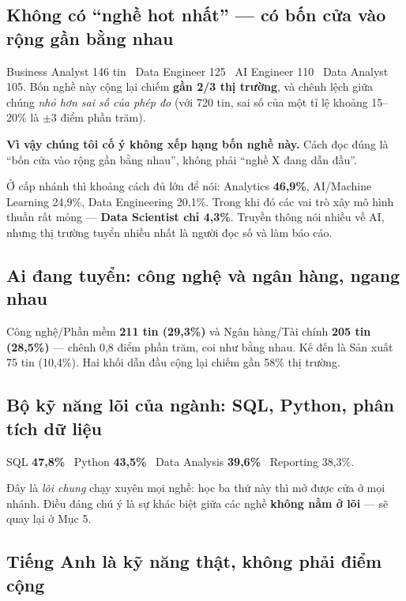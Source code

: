 \documentclass[10pt]{article}
\newcommand{\keyfind}[1]{\textbf{#1}}
\begin{document}
\subsection{Không có ``nghề hot nhất'' --- có bốn cửa vào rộng gần bằng nhau}

Business Analyst 146 tin \textbar\ Data Engineer 125 \textbar\ AI Engineer 110 \textbar\ Data Analyst 105.
Bốn nghề này cộng lại chiếm \textbf{gần 2/3 thị trường}, và chênh lệch giữa chúng \emph{nhỏ hơn sai số của
phép đo} (với 720 tin, sai số của một tỉ lệ khoảng 15--20\% là $\pm$3 điểm phần trăm).

\keyfind{Vì vậy chúng tôi cố ý không xếp hạng bốn nghề này.} Cách đọc đúng là ``bốn cửa vào rộng gần
bằng nhau'', không phải ``nghề X đang dẫn đầu''.

Ở cấp nhánh thì khoảng cách đủ lớn để nói: Analytics \textbf{46,9\%}, AI/Machine Learning 24,9\%,
Data Engineering 20,1\%. Trong khi đó các vai trò xây mô hình thuần rất mỏng --- \keyfind{Data Scientist
chỉ 4,3\%}. Truyền thông nói nhiều về AI, nhưng thị trường tuyển nhiều nhất là người đọc số và làm báo cáo.

\subsection{Ai đang tuyển: công nghệ và ngân hàng, ngang nhau}

Công nghệ/Phần mềm \textbf{211 tin (29,3\%)} và Ngân hàng/Tài chính \textbf{205 tin (28,5\%)} --- chênh
0,8 điểm phần trăm, coi như bằng nhau. Kế đến là Sản xuất 75 tin (10,4\%). Hai khối dẫn đầu cộng lại
chiếm gần 58\% thị trường.

\subsection{Bộ kỹ năng lõi của ngành: SQL, Python, phân tích dữ liệu}

SQL \textbf{47,8\%} \textbar\ Python \textbf{43,5\%} \textbar\ Data Analysis \textbf{39,6\%} \textbar\
Reporting 38,3\%.

Đây là \emph{lõi chung} chạy xuyên mọi nghề: học ba thứ này thì mở được cửa ở mọi nhánh. Điều đáng chú ý
là sự khác biệt giữa các nghề \textbf{không nằm ở lõi} --- sẽ quay lại ở Mục 5.

\subsection{Tiếng Anh là kỹ năng thật, không phải điểm cộng}
\end{document}
